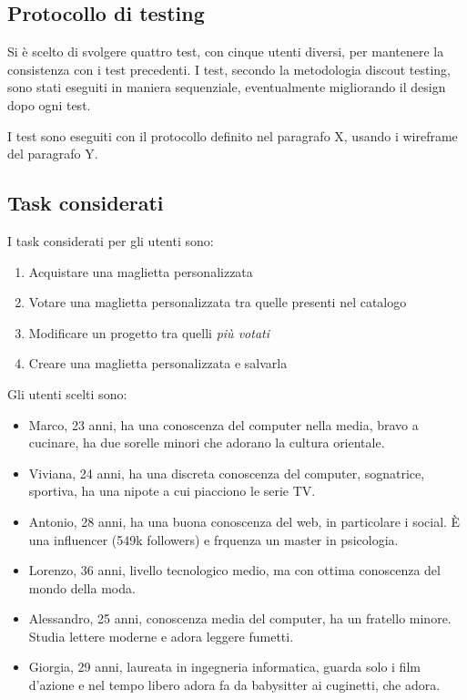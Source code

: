\documentclass[12pt,italian,]{report}
\providecommand{\tightlist}{%
  \setlength{\itemsep}{0pt}\setlength{\parskip}{0pt}}
\begin{document}
\hypertarget{protocollo-di-testing-1}{%
\subsection{Protocollo di testing}\label{protocollo-di-testing-1}}

Si è scelto di svolgere quattro test, con cinque utenti diversi, per
mantenere la consistenza con i test precedenti. I test, secondo la
metodologia discout testing​, sono stati eseguiti in maniera
sequenziale, eventualmente migliorando il design dopo ogni test.

I test sono eseguiti con il protocollo definito nel paragrafo X, usando
i wireframe del paragrafo Y.

\hypertarget{task-considerati}{%
\subsection{Task considerati}\label{task-considerati}}

I task considerati per gli utenti sono:

\begin{enumerate}
\def\labelenumi{\arabic{enumi}.}
\tightlist
\item
  Acquistare una maglietta personalizzata
\item
  Votare una maglietta personalizzata tra quelle presenti nel catalogo
\item
  Modificare un progetto tra quelli \emph{più votati}
\item
  Creare una maglietta personalizzata e salvarla
\end{enumerate}

Gli utenti scelti sono:

\begin{itemize}
\tightlist
\item
  Marco, 23 anni, ha una conoscenza del computer nella media, bravo a
  cucinare, ha due sorelle minori che adorano la cultura orientale.
\item
  Viviana, 24 anni, ha una discreta conoscenza del computer, sognatrice,
  sportiva, ha una nipote a cui piacciono le serie TV.
\item
  Antonio, 28 anni, ha una buona conoscenza del web, in particolare i
  social. È una influencer (549k followers) e frquenza un master in
  psicologia.
\item
  Lorenzo, 36 anni, livello tecnologico medio, ma con ottima conoscenza
  del mondo della moda.
\item
  Alessandro, 25 anni, conoscenza media del computer, ha un fratello
  minore. Studia lettere moderne e adora leggere fumetti.
\item
  Giorgia, 29 anni, laureata in ingegneria informatica, guarda solo i
  film d'azione e nel tempo libero adora fa da babysitter ai cuginetti,
  che adora.
\end{itemize}
\end{document}
